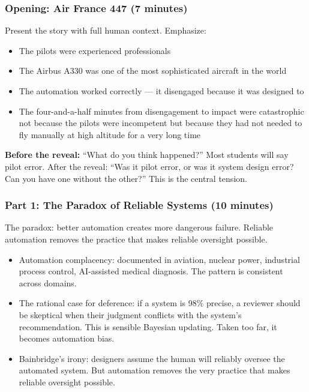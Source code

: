 \subsubsection{Opening: Air France 447 (7 minutes)}

Present the story with full human context. Emphasize:
\begin{itemize}
    \item The pilots were experienced professionals
    \item The Airbus A330 was one of the most sophisticated aircraft in the world
    \item The automation worked correctly --- it disengaged because it was designed to
    \item The four-and-a-half minutes from disengagement to impact were catastrophic not because the pilots were incompetent but because they had not needed to fly manually at high altitude for a very long time
\end{itemize}

\begin{trythis}
\textbf{Before the reveal:} ``What do you think happened?'' Most students will say pilot error. After the reveal: ``Was it pilot error, or was it system design error? Can you have one without the other?'' This is the central tension.
\end{trythis}

\subsubsection{Part 1: The Paradox of Reliable Systems (10 minutes)}

The paradox: better automation creates more dangerous failure. Reliable automation removes the practice that makes reliable oversight possible.

\begin{itemize}
    \item Automation complacency: documented in aviation, nuclear power, industrial process control, AI-assisted medical diagnosis. The pattern is consistent across domains.
    \item The rational case for deference: if a system is 98\% precise, a reviewer should be skeptical when their judgment conflicts with the system's recommendation. This is sensible Bayesian updating. Taken too far, it becomes automation bias.
    \item Bainbridge's irony: designers assume the human will reliably oversee the automated system. But automation removes the very practice that makes reliable oversight possible.
\end{itemize}

